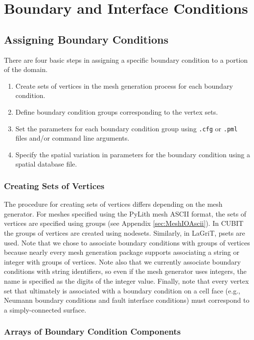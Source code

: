 
\chapter{\label{cha:boundary:interface:conditions}Boundary and Interface
Conditions}


\section{Assigning Boundary Conditions}

There are four basic steps in assigning a specific boundary condition
to a portion of the domain.
\begin{enumerate}
\item Create sets of vertices in the mesh generation process for each boundary
condition.
\item Define boundary condition groups corresponding to the vertex sets.
\item Set the parameters for each boundary condition group using \texttt{.cfg}
or \texttt{.pml} files and/or command line arguments.
\item Specify the spatial variation in parameters for the boundary condition
using a spatial database file.
\end{enumerate}

\subsection{Creating Sets of Vertices}

The procedure for creating sets of vertices differs depending on the
mesh generator. For meshes specified using the PyLith mesh ASCII format,
the sets of vertices are specified using groups (see Appendix \ref{sec:MeshIOAscii}).
In CUBIT the groups of vertices are created using nodesets. Similarly,
in LaGriT, psets are used. Note that we chose to associate boundary
conditions with groups of vertices because nearly every mesh generation
package supports associating a string or integer with groups of vertices.
Note also that we currently associate boundary conditions with string
identifiers, so even if the mesh generator uses integers, the name
is specified as the digits of the integer value. Finally, note that
every vertex set that ultimately is associated with a boundary condition
on a cell face (e.g., Neumann boundary conditions and fault interface
conditions) must correspond to a simply-connected surface.


\subsection{Arrays of Boundary Condition Components}

